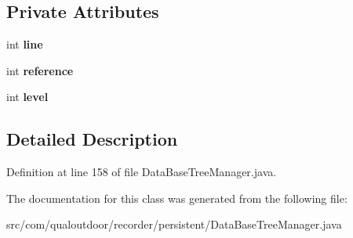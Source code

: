 \subsection*{Private Attributes}
\begin{DoxyCompactItemize}
\item 
\hypertarget{classcom_1_1qualoutdoor_1_1recorder_1_1persistent_1_1DataBaseTreeManager_1_1TreeCursor_a4a0a5f9a2b323cb3df093066d86b8b3f}{int {\bfseries line}}\label{classcom_1_1qualoutdoor_1_1recorder_1_1persistent_1_1DataBaseTreeManager_1_1TreeCursor_a4a0a5f9a2b323cb3df093066d86b8b3f}

\item 
\hypertarget{classcom_1_1qualoutdoor_1_1recorder_1_1persistent_1_1DataBaseTreeManager_1_1TreeCursor_a7275276eeef8593bb0e2a504a5c851f5}{int {\bfseries reference}}\label{classcom_1_1qualoutdoor_1_1recorder_1_1persistent_1_1DataBaseTreeManager_1_1TreeCursor_a7275276eeef8593bb0e2a504a5c851f5}

\item 
\hypertarget{classcom_1_1qualoutdoor_1_1recorder_1_1persistent_1_1DataBaseTreeManager_1_1TreeCursor_aea0320cf9102a3b3a4f60e54ff32e368}{int {\bfseries level}}\label{classcom_1_1qualoutdoor_1_1recorder_1_1persistent_1_1DataBaseTreeManager_1_1TreeCursor_aea0320cf9102a3b3a4f60e54ff32e368}

\end{DoxyCompactItemize}


\subsection{Detailed Description}


Definition at line 158 of file Data\-Base\-Tree\-Manager.\-java.



The documentation for this class was generated from the following file\-:\begin{DoxyCompactItemize}
\item 
src/com/qualoutdoor/recorder/persistent/Data\-Base\-Tree\-Manager.\-java\end{DoxyCompactItemize}
